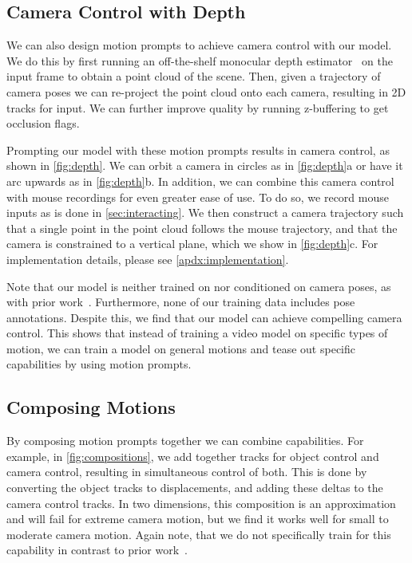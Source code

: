 \subsection{Camera Control with Depth}
\label{sec:depth}

We can also design motion prompts to achieve camera control with our model. We do this by first running an off-the-shelf monocular depth estimator~\cite{piccinelli2024unidepth} on the input frame to obtain a point cloud of the scene. Then, given a trajectory of camera poses we can re-project the point cloud onto each camera, resulting in 2D tracks for input.
We can further improve quality by running z-buffering to get occlusion flags.

Prompting our model with these motion prompts results in camera control, as shown in \cref{fig:depth}. We can orbit a camera in circles as in \cref{fig:depth}a or have it arc upwards as in \cref{fig:depth}b. In addition, we can combine this camera control with mouse recordings for even greater ease of use. To do so, we record mouse inputs as is done in \cref{sec:interacting}. We then construct a camera trajectory such that a single point in the point cloud follows the mouse trajectory, and that the camera is constrained to a vertical plane, which we show in \cref{fig:depth}c.
For implementation details, please see \cref{apdx:implementation}.

Note that our model is neither trained on nor conditioned on camera poses, as with prior work~\cite{wang2024motionctrl,li2024image,watson2024controlling}. Furthermore, none of our training data includes pose annotations. 
Despite this, we find that our model can achieve compelling camera control. 
This shows that instead of training a video model on specific types of motion, we can train a model on general motions and tease out specific capabilities by using motion prompts.

\subsection{Composing Motions}
\label{sec:composition}



By composing motion prompts together we can combine capabilities. For example, in \cref{fig:compositions}, we add together tracks for object control and camera control, resulting in simultaneous control of both. This is done by converting the object tracks to displacements, and adding these deltas to the camera control tracks. In two dimensions, this composition is an approximation and will fail for extreme camera motion, but we find it works well for small to moderate camera motion. 
Again note, that we do not specifically train for this capability in contrast to prior work~\cite{wang2024motionctrl,li2024image,watson2024controlling}.


